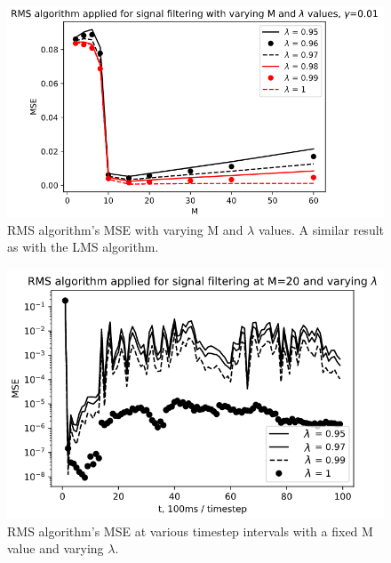 \documentclass[10pt,a4paper,twocolumn]{article}
\begin{document}
\begin{figure} %
	[!h]
	\centering
	\includegraphics*[width=.8\columnwidth]{f5.png} %
	\caption{RMS algorithm's MSE with varying M and $\lambda$ values. A similar result as with the LMS algorithm.}
	\label{f5}
	\vspace{6pt}
\end{figure}

\begin{figure} %
	[!h]
	\centering
	\includegraphics*[width=.8\columnwidth]{f6.png} %
	\caption{RMS algorithm's MSE at various timestep intervals with a fixed M value and varying $\lambda$. }
	\label{f6}
	\vspace{6pt}
\end{figure}
\end{document}
